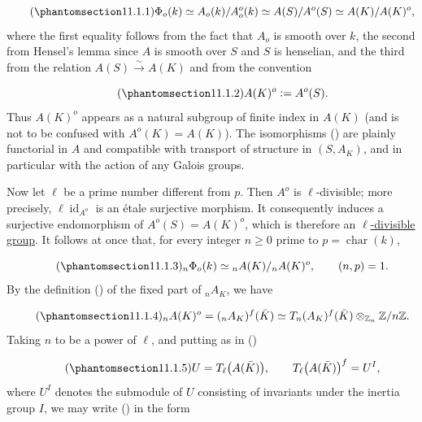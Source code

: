 \begin{equation}\tag{\SGARefTarget{sga7.sga7i.eix.n11-1-1}{11.1.1}}
\Phi_o(k)\simeq A_o(k)/A_o^o(k)
 \simeq A(S)/A^o(S)
 \simeq A(K)/A(K)^o,
\end{equation}
where the first equality follows from the fact that $A_o$ is smooth over
$k$, the second from Hensel's lemma since $A$ is smooth over $S$ and
$S$ is henselian, and the third from the relation
$A(S)\xrightarrow{\sim}A(K)$ and from the convention

\begin{equation}\tag{\SGARefTarget{sga7.sga7i.eix.n11-1-2}{11.1.2}}
A(K)^o\mathrel{\mathop:}=A^o(S).
\end{equation}
Thus $A(K)^o$ appears as a natural subgroup of finite index in $A(K)$
(and is not to be confused with $A^o(K)=A(K)$). The isomorphisms
() are plainly functorial in $A$ and compatible with transport of
structure in $(S,A_K)$, and in particular with the action of any Galois
groups.

Now let $\ell$ be a prime number different from $p$. Then $A^o$ is
$\ell$-divisible; more precisely, $\ell\operatorname{id}_{A^o}$ is an
\'etale surjective morphism. It consequently induces a surjective
endomorphism of $A^o(S)=A(K)^o$, which is therefore an
\underline{$\ell$-divisible group}. It follows at once that, for every
integer $n\geq 0$ prime to $p=\operatorname{char}(k)$,

\begin{equation}\tag{\SGARefTarget{sga7.sga7i.eix.n11-1-3}{11.1.3}}
{}_n\Phi_o(k)\simeq{}_nA(K)/{}_nA(K)^o,
 \qquad (n,p)=1.
\end{equation}
By the definition () of the fixed part of ${}_nA_K$, we have

\begin{equation}\tag{\SGARefTarget{sga7.sga7i.eix.n11-1-4}{11.1.4}}
{}_nA(K)^o=({}_nA_K)^f(\bar K)
 \simeq T_n(A_K)^f(\bar K)
 \otimes_{\mathbb Z_n}\mathbb Z/n\mathbb Z.
\end{equation}
Taking $n$ to be a power of $\ell$, and putting as in ()

\begin{equation}\tag{\SGARefTarget{sga7.sga7i.eix.n11-1-5}{11.1.5}}
U=T_\ell\bigl(A(\bar K)\bigr),
 \qquad
T_\ell\bigl(A(\bar K)\bigr)^f=U^I,
\end{equation}
where $U^I$ denotes the submodule of $U$ consisting of invariants under
the inertia group $I$, we may write () in the form

